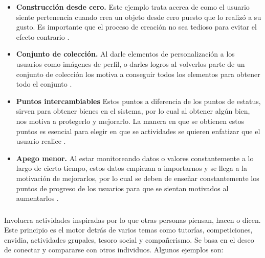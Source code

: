     \begin{itemize}
    \item
    {\bf Construcción desde cero.}
        Este ejemplo trata acerca de como el usuario siente pertenencia cuando crea
        un objeto desde cero puesto que lo realizó a su gusto. Es importante que el
        proceso de creación no sea tedioso para evitar el efecto contrario
        \cite[p. 182]{Octalysis}.
        
    \item
    {\bf Conjunto de colección.}
        Al darle elementos de personalización a los usuarios como imágenes de perfil,
        o darles logros al volverlos parte de un conjunto de colección los motiva a
        conseguir todos los elementos para obtener todo el conjunto
        \cite[p. 183]{Octalysis}.
        
    \item
    {\bf Puntos intercambiables}
        Estos puntos a diferencia de los puntos de estatus, sirven para obtener bienes
        en el sistema, por lo cual al obtener algún bien, nos motiva a protegerlo y
        mejorarlo. La manera en que se obtienen estos puntos es esencial para elegir
        en que se actividades se quieren enfatizar que el usuario realice
        \cite[p. 187]{Octalysis}.
        
    \item
    {\bf Apego menor.}
        Al estar monitoreando datos o valores constantemente a lo largo de cierto tiempo,
        estos datos empiezan a importarnos y se llega a la motivación de mejorarlos,
        por lo cual se deben de enseñar constantemente los puntos de progreso de los
        usuarios para que se sientan motivados al aumentarlos \cite[p. 189]{Octalysis}.

    \end{itemize}
    
\subsubsection{\principioV} \label{subsec:principioV}
    
 Involucra actividades inspiradas por lo que otras personas piensan, hacen o dicen. Este
 principio es el motor detrás de varios temas como tutorías, competiciones, envidia,
 actividades grupales, tesoro social y compañerismo. Se basa en el deseo de conectar y
 compararse con otros individuos.\cite[p. 197]{Octalysis} Algunos ejemplos son:
    
